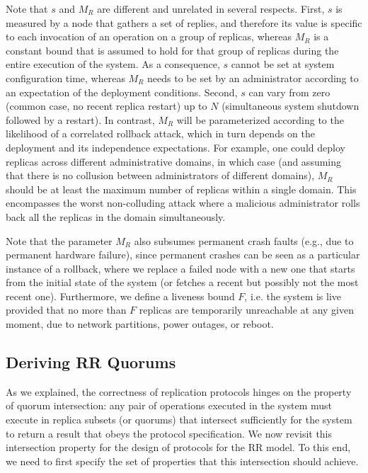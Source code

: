 Note that $s$ and $M_R$ are different
and unrelated in several respects. First, $s$ is measured by a node
that gathers a set of replies, and therefore its value is specific to
each invocation of an operation on a group of replicas, whereas $M_R$ is
a constant bound that is assumed to hold for that group of replicas
during the entire execution of the system. As a consequence, $s$
cannot be set at system configuration time, whereas $M_R$ needs to be
set by an administrator according to an expectation of the deployment
conditions. Second, $s$ can vary from zero (common case, no recent
replica restart) up to $N$ (simultaneous system shutdown followed by a
restart). In contrast, $M_R$ will be parameterized according to the
likelihood of a correlated rollback attack, which in turn depends on
the deployment and its independence expectations. For example, one
could deploy replicas across different administrative domains,
in which case (and assuming
that there is no collusion between administrators of different domains), $M_R$
should be at least the maximum number of replicas within a single
domain. This encompasses the worst non-colluding attack where a malicious administrator rolls back all
the replicas in the domain simultaneously.

Note that the parameter $M_R$ also subsumes permanent crash faults
(e.g., due to permanent hardware failure), since permanent crashes
can be seen as
a particular instance of a rollback, where we replace a
failed node with a new one that starts from the initial
state of the system (or fetches a recent but possibly not the
most recent one).
%
Furthermore, we define a liveness bound $F$, i.e. the system is live
provided that no more than $F$ replicas are temporarily unreachable at
any given moment, due to network partitions, power outages, or reboot.

\subsection{Deriving {\ac{RR} Quorums}}\label{sec:parameters}

As we explained, the correctness of replication protocols hinges
on the property of quorum intersection: any pair of operations
executed in the system must execute in replica subsets (or
quorums) that intersect sufficiently for the system to return a
result that obeys the protocol specification. We now revisit this
intersection property for the design of protocols for the \ac{RR}
model. To this end, we need to first specify the set of
properties that this intersection should achieve.



